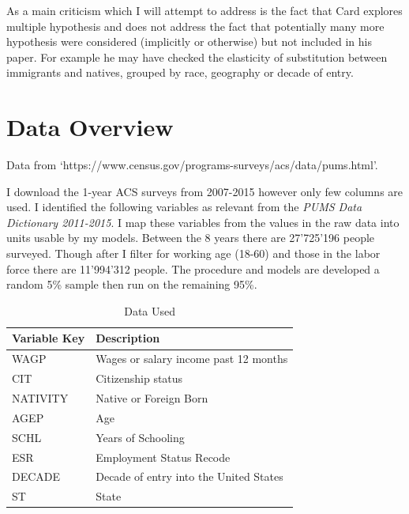 \documentclass[11pt]{article}
\theoremstyle{definition}
\theoremstyle{remark}
\begin{document}
As a main criticism which I will attempt to address is the fact that Card explores
multiple hypothesis and does not address the fact that potentially many more hypothesis
were considered (implicitly or otherwise) but not included in his paper. For example
he may have checked the elasticity of substitution between immigrants and natives,
grouped by race, geography or decade of entry.

\section{Data Overview}

Data from `https://www.census.gov/programs-surveys/acs/data/pums.html'.

I download the 1-year ACS surveys from 2007-2015 however only few columns
are used. I identified the following variables as relevant from the
\textit{PUMS Data Dictionary 2011-2015}. I map these variables from the
values in the raw data into units usable by my models.
Between the 8 years there are 27'725'196 people surveyed.
Though after I filter for working age (18-60) and those in the labor force
there are 11'994'312 people.
The procedure and models are developed a random 5\% sample then run
on the remaining 95\%.


\begin{table}[H]
    \caption{Data Used }
    \vspace{5mm}
    \label{}
    \centering
    \begin{tabular}{| l | l |}
        \hline
        Variable Key    & Description \\
        \hline \hline

        WAGP            & Wages or salary income past 12 months \\
        CIT             & Citizenship status \\
        NATIVITY        & Native or Foreign Born \\
        AGEP            & Age \\
        SCHL            & Years of Schooling \\
        ESR             & Employment Status Recode \\
        DECADE          & Decade of entry into the United States \\
        ST              & State \\
        \hline
    \end{tabular}
\end{table}
\end{document}

